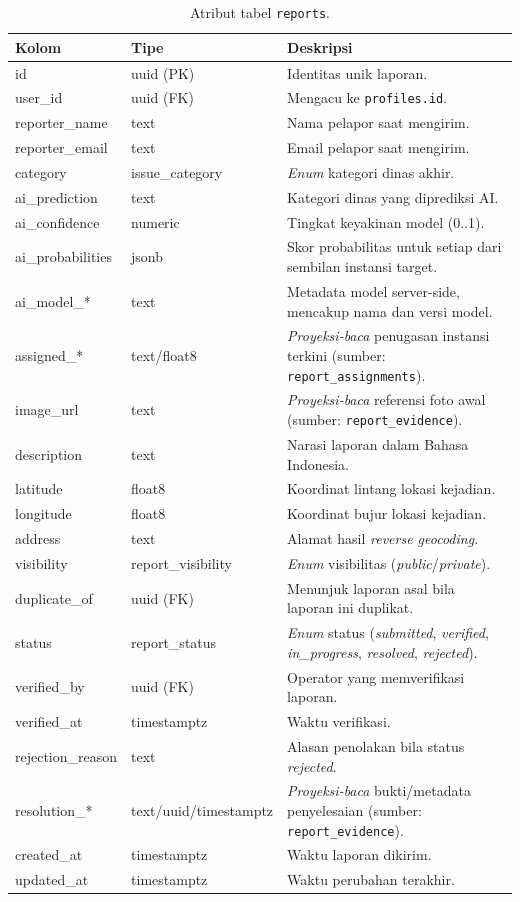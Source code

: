\begin{table}[htbp]
\centering
\caption{Atribut tabel \texttt{reports}.}
\label{tab:reports}
\small
\begin{tabular}{p{3.4cm} p{2.6cm} p{6.5cm}}
\toprule
\textbf{Kolom} & \textbf{Tipe} & \textbf{Deskripsi} \\
\midrule
id & uuid (PK) & Identitas unik laporan. \\
user\_id & uuid (FK) & Mengacu ke \texttt{profiles.id}. \\
reporter\_name & text & Nama pelapor saat mengirim. \\
reporter\_email & text & Email pelapor saat mengirim. \\
category & issue\_category & \textit{Enum} kategori dinas akhir. \\
ai\_prediction & text & Kategori dinas yang diprediksi AI. \\
ai\_confidence & numeric & Tingkat keyakinan model (0..1). \\
ai\_probabilities & jsonb & Skor probabilitas untuk setiap dari sembilan instansi target. \\
ai\_model\_* & text & Metadata model server-side, mencakup nama dan versi model. \\
assigned\_* & text/float8 & \textit{Proyeksi-baca} penugasan instansi terkini (sumber: \texttt{report\_assignments}). \\
image\_url & text & \textit{Proyeksi-baca} referensi foto awal (sumber: \texttt{report\_evidence}). \\
description & text & Narasi laporan dalam Bahasa Indonesia. \\
latitude & float8 & Koordinat lintang lokasi kejadian. \\
longitude & float8 & Koordinat bujur lokasi kejadian. \\
address & text & Alamat hasil \textit{reverse geocoding}. \\
visibility & report\_visibility & \textit{Enum} visibilitas (\textit{public}/\textit{private}). \\
duplicate\_of & uuid (FK) & Menunjuk laporan asal bila laporan ini duplikat. \\
status & report\_status & \textit{Enum} status (\textit{submitted}, \textit{verified}, \textit{in\_progress}, \textit{resolved}, \textit{rejected}). \\
verified\_by & uuid (FK) & Operator yang memverifikasi laporan. \\
verified\_at & timestamptz & Waktu verifikasi. \\
rejection\_reason & text & Alasan penolakan bila status \textit{rejected}. \\
resolution\_* & text/\allowbreak{}uuid/\allowbreak{}timestamptz & \textit{Proyeksi-baca} bukti/metadata penyelesaian (sumber: \texttt{report\_evidence}). \\
created\_at & timestamptz & Waktu laporan dikirim. \\
updated\_at & timestamptz & Waktu perubahan terakhir. \\
\bottomrule
\end{tabular}
\end{table}

